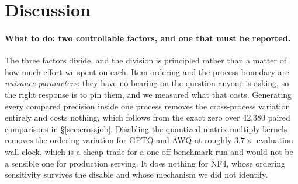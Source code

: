 \documentclass[11pt]{article}
\begin{document}
%
%
%


\section{Discussion}
\label{sec:discussion}

\paragraph{What to do: two controllable factors, and one that must be reported.}
The three factors divide, and the division is principled rather than a matter of how
much effort we spent on each. Item ordering and the process boundary are \emph{nuisance
parameters}: they have no bearing on the question anyone is asking, so the right response
is to pin them, and we measured what that costs. Generating every compared precision
inside one process removes the cross-process variation entirely and costs nothing, which
follows from the exact zero over 42{,}380 paired comparisons in
\S\ref{sec:crossjob}. Disabling the quantized matrix-multiply kernels removes the
ordering variation for GPTQ and AWQ at roughly $3.7\times$ evaluation wall clock, which is
a cheap trade for a one-off benchmark run and would not be a sensible one for production
serving. It does nothing for NF4, whose ordering sensitivity survives the disable and
whose mechanism we did not identify.
\end{document}
